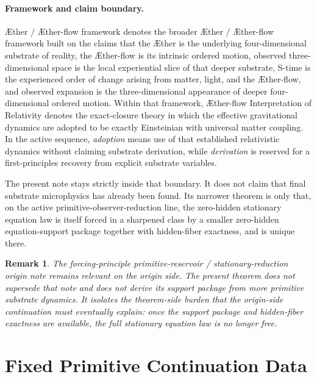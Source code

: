 \documentclass[11pt]{article}
\newcommand{\Aether}{\AE{}ther}
\newcommand{\Aflow}{\AE{}ther-flow}
\newcommand{\TheoryName}{\Aflow{} Interpretation of Relativity}
\newcommand{\TheoryProgram}{\Aether{} / \Aflow{} framework}
\newtheorem{remark}{Remark}
\begin{document}
\paragraph{Framework and claim boundary.}
\TheoryProgram{} denotes the broader \Aether{} / \Aflow{} framework built on the claims that the \Aether{} is the underlying four-dimensional substrate of reality, the \Aflow{} is its intrinsic ordered motion, observed three-dimensional space is the local experiential slice of that deeper substrate, S-time is the experienced order of change arising from matter, light, and the \Aflow{}, and observed expansion is the three-dimensional appearance of deeper four-dimensional ordered motion. Within that framework, \TheoryName{} denotes the exact-closure theory in which the effective gravitational dynamics are adopted to be exactly Einsteinian with universal matter coupling. In the active sequence, \emph{adoption} means use of that established relativistic dynamics without claiming substrate derivation, while \emph{derivation} is reserved for a first-principles recovery from explicit substrate variables.

The present note stays strictly inside that boundary. It does not claim that final substrate microphysics has already been found. Its narrower theorem is only that, on the active primitive-observer-reduction line, the zero-hidden stationary equation law is itself forced in a sharpened class by a smaller zero-hidden equation-support package together with hidden-fiber exactness, and is unique there.

\begin{remark}
The forcing-principle primitive-reservoir / stationary-reduction origin note remains relevant on the origin side. The present theorem does not supersede that note and does not derive its support package from more primitive substrate dynamics. It isolates the theorem-side burden that the origin-side continuation must eventually explain: once the support package and hidden-fiber exactness are available, the full stationary equation law is no longer free.
\end{remark}

\section{Fixed Primitive Continuation Data}
\end{document}
